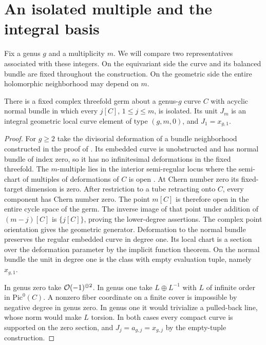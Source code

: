 \section{An isolated multiple and the integral basis}\label{sec:basis}

Fix a genus $g$ and a multiplicity $m$. We will compare two
representatives associated with these integers. On the equivariant
side the curve and its balanced bundle are fixed throughout the
construction. On the geometric side the entire holomorphic neighborhood
may depend on $m$.

\begin{lemma}\label{lem:germ}
There is a fixed complex threefold germ about a genus-$g$ curve $C$
with acyclic normal bundle in which every $j[C]$, $1\le j\le m$, is
isolated. Its unit $J_m$ is an integral geometric local curve element of
type $(g,m,0)$, and $J_1=x_{g,1}$.
\end{lemma}
\begin{proof}
For $g\ge2$ take the divisorial deformation of a bundle neighborhood
constructed in the proof of \cite[Lemma~6.7]{Pardon}. Its embedded curve
is unobstructed and has normal bundle of index zero, so it has no
infinitesimal deformations in the fixed threefold. The $m$-multiple lies
in the interior semi-regular locus where the semi-chart of multiples of
deformations of $C$ is open \cite[Lemma~6.3 and Definition~6.6]{Pardon}.
At Chern number zero its fixed-target dimension is zero. After restriction
to a tube retracting onto $C$, every component has Chern number zero.
The point $m[C]$ is therefore open in the entire cycle space of the
germ. The inverse image of that point under addition of $(m-j)[C]$ is
$\{j[C]\}$, proving the lower-degree assertions. The complex point
orientation gives the geometric generator. Deformation to the normal
bundle preserves the regular embedded curve in degree one. Its local
chart is a section over the deformation parameter by the implicit
function theorem. On the normal bundle the unit in degree one is
the class with empty evaluation tuple, namely $x_{g,1}$.

In genus zero take $\mathcal O(-1)^{\oplus2}$. In genus one take
$L\oplus L^{-1}$ with $L$ of infinite order in $\mathrm{Pic}^0(C)$.
A nonzero fiber coordinate on a finite cover is impossible by negative
degree in genus zero. In genus one it would trivialize a pulled-back
line, whose norm would make $L$ torsion. In both cases every compact
curve is supported on the zero section, and $J_j=a_{g,j}=x_{g,j}$ by
the empty-tuple construction.
\end{proof}

